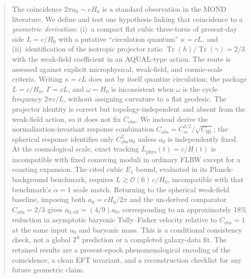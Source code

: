 \documentclass[aps,prd,reprint,superscriptaddress,nofootinbib,floatfix,showkeys]{revtex4-2}
\newcommand{\Tthree}{T^{3}}
\newcommand{\Cobs}{C_{\mathrm{obs}}}
\newcommand{\Cm}{C_{m}}
\newcommand{\CIR}{C_{\mathrm{IR}}}
\newcommand{\azero}{a_{0}}
\newcommand{\Hzero}{H_{0}}
\begin{document}
\begin{abstract}
The coincidence \(2\pi\azero\sim c\Hzero\) is a standard observation in the
MOND literature.  We define and test one hypothesis linking that coincidence to a
\emph{geometric derivation}: (i)~a compact flat cubic three-torus of present-day
side \(L=c/\Hzero\) with a putative ``circulation quantum'' \(\kappa=cL\), and
(ii)~identification of the isotropic projector ratio
\(\operatorname{Tr}(h)/\operatorname{Tr}(\gamma)=2/3\) with the weak-field
coefficient in an AQUAL-type action.  The route is assessed against explicit
microphysical, weak-field, and cosmic-scale criteria.  Writing \(\kappa=cL\)
does not by itself quantize circulation; the package \(L=c/\Hzero\),
\(\Gamma=cL\), and \(\omega=\Hzero\) is inconsistent when \(\omega\) is the
cycle frequency \(2\pi v/L\), without assigning curvature to a flat geodesic.
The projector identity is correct but
topology-independent and absent from the weak-field action, so it does not fix
\(\Cobs\).  We instead derive the normalization-invariant response combination
\(\Cobs=\Cm^{3/2}/\sqrt{\CIR}\); the spherical response identifies only
\(\Cobs^2\azero\) unless \(\azero\) is independently fixed.
At the cosmological scale, exact tracking \(L_{\mathrm{phys}}(t)=c/H(t)\) is
incompatible with fixed comoving moduli in ordinary FLRW except for a
coasting expansion.  The cited cubic \(E_1\) bound, evaluated in its
Planck-background benchmark, requires \(L\gtrsim\mathcal{O}(6)\,c/\Hzero\),
incompatible with that benchmark's \(\alpha=1\) scale match.
Returning to the spherical weak-field baseline, imposing
both \(\azero=c\Hzero/2\pi\) and the un-derived comparator \(\Cobs=2/3\)
gives \(a_{0,\mathrm{eff}}=(4/9)\azero\), corresponding to an approximately
18\% reduction in asymptotic baryonic Tully--Fisher velocity relative to
\(\Cobs=1\) at the same input \(\azero\) and baryonic mass. This
is a conditional consistency check, not a global \(\Tthree\) prediction or a
completed galaxy-data fit.  The retained results are a present-epoch
phenomenological encoding of the coincidence, a clean EFT invariant, and a
reconstruction checklist for any future geometric claim.
\end{abstract}


\maketitle
\end{document}
